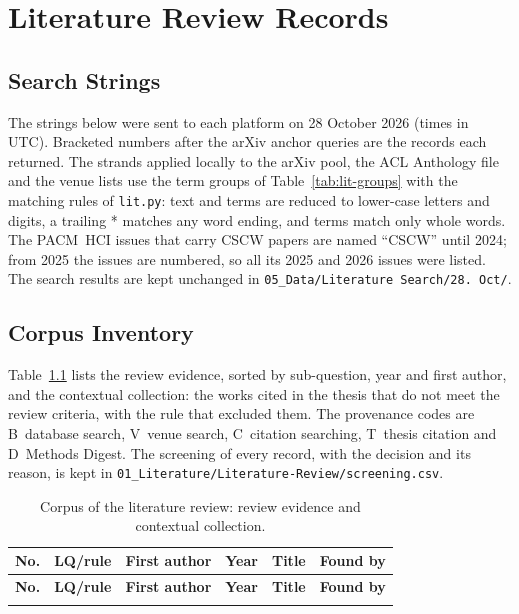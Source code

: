 \chapter{Literature Review Records}
\label{app:literature}

\section{Search Strings}
\label{app:lit-strings}
The strings below were sent to each platform on 28 October 2026 (times in
UTC). Bracketed numbers after the arXiv anchor queries are the records each
returned. The strands applied locally to the arXiv pool, the ACL Anthology file
and the venue lists use the term groups of Table~\ref{tab:lit-groups} with the
matching rules of \texttt{lit.py}: text and terms are reduced to lower-case
letters and digits, a trailing * matches any word ending, and terms match only
whole words. The PACM~HCI issues that carry CSCW papers are named
\enquote{CSCW} until 2024; from 2025 the issues are numbered, so all its 2025
and 2026 issues were listed. The search results are kept unchanged in
\texttt{05\_Data/Literature Search/28. Oct/}.

{\small

}

\section{Corpus Inventory}
\label{app:lit-inventory}
Table~\ref{tab:lit-included} lists the review evidence, sorted by sub-question,
year and first author, and the contextual collection: the works cited in the
thesis that do not meet the review criteria, with the rule that excluded them.
The provenance codes are B~database search, V~venue search, C~citation
searching, T~thesis citation and D~Methods Digest. The screening of every
record, with the decision and its reason, is kept in
\texttt{01\_Literature/Literature-Review/screening.csv}.

{\small
\setlength{\tabcolsep}{4pt}
\begin{longtable}{@{}r l >{\raggedright\arraybackslash}p{2.2cm} r >{\raggedright\arraybackslash}p{6.4cm} l@{}}
\caption{Corpus of the literature review: review evidence and contextual collection.}\label{tab:lit-included}\\
\toprule
\textbf{No.} & \textbf{LQ/rule} & \textbf{First author} & \textbf{Year} & \textbf{Title} & \textbf{Found by} \\
\midrule
\endfirsthead
\toprule
\textbf{No.} & \textbf{LQ/rule} & \textbf{First author} & \textbf{Year} & \textbf{Title} & \textbf{Found by} \\
\midrule
\endhead
\bottomrule
\endfoot

\end{longtable}
}
